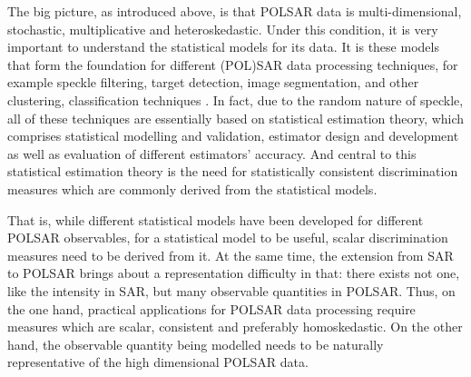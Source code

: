 The
                big picture, as introduced above, is that POLSAR data is multi-dimensional,
                stochastic, multiplicative and heteroskedastic.
Under this condition, it is very important to understand the statistical models for its
data. It is these models that form the foundation for different (POL)SAR data processing
techniques, for example speckle filtering, target detection, image segmentation, and
other clustering, classification techniques \cite{Lopez-Martinez_2003_TGRS_2232, Argenti_GRSM_2013, Conradsen_2003_TGRS_4}.
In fact, due to the random nature of speckle, all of these techniques are essentially based on statistical estimation theory,
which comprises statistical modelling and validation, estimator design and development
as well as evaluation of different estimators' accuracy. And central to this statistical
estimation theory is the need for statistically consistent discrimination measures which
are commonly derived from the statistical models.

That is, while different statistical models have been developed for different POLSAR
observables, for a statistical model to be useful, scalar discrimination measures need to
be derived from it. At the same time, the extension from SAR to POLSAR brings about
a representation difficulty in that: there exists not one, like the intensity in SAR, but
many observable quantities in POLSAR. Thus, on the one hand, practical applications for
POLSAR data processing require measures which are scalar, consistent and preferably
homoskedastic. On the other hand, the observable quantity being modelled needs to
be naturally representative of the high dimensional POLSAR data.

